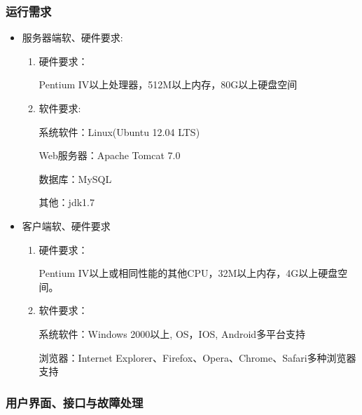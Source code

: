 \documentclass[12pt,a4paper]{article}
\begin{document}
		\subsubsection{运行需求}
\begin{itemize}
	\item
	服务器端软、硬件要求:
	\begin{enumerate}[(1)]
	\item
	硬件要求：
	
	{\Times Pentium IV}以上处理器，512M以上内存，80G以上硬盘空间
	
	\item
	软件要求:
	
	系统软件：{\Times Linux(Ubuntu 12.04 LTS)}
	
	{\Times Web}服务器：{\Times Apache Tomcat 7.0}
	
	数据库：{\Times MySQL}
	
	其他：{\Times jdk1.7}
	\end{enumerate}
	
	\item
	客户端软、硬件要求
	\begin{enumerate}[(1)]
	\item
	硬件要求：
	
	{\Times Pentium IV}以上或相同性能的其他{\Times CPU}，{\Times 32M}以上内存，{\Times 4G}以上硬盘空间。
	
	\item
	软件要求：
	
	系统软件：{\Times Windows 2000}以上, {\Times OS}，{\Times IOS}, {\Times Android}多平台支持
	
	浏览器：{\Times Internet Explorer}、{\Times Firefox}、{\Times Opera}、{\Times Chrome}、{\Times Safari}多种浏览器支持
	\end{enumerate}
	
\end{itemize}
		
		\subsubsection{用户界面、接口与故障处理}	
		
\end{document}
